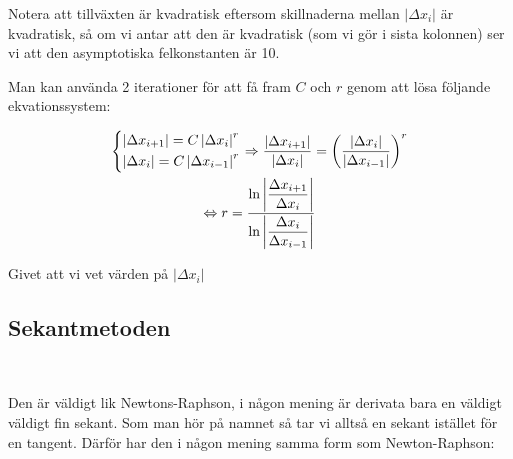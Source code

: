 \noindent Notera att tillväxten är kvadratisk eftersom skillnaderna mellan $\left|\Delta x_i\right|$ är kvadratisk, så om vi antar att den är kvadratisk (som vi gör i sista kolonnen) ser vi att den asymptotiska felkonstanten är 10.
\par\bigskip
\noindent Man kan använda 2 iterationer för att få fram $C$ och $r$ genom att lösa följande ekvationssystem:


\begin{equation*}
  \begin{gathered}
    \begin{cases*}
      \left|\Delta x_{i+1}\right| = C\left|\Delta x_i\right|^r\\
      \left|\Delta x_i\right| = C\left|\Delta x_{i-1}\right|^r
    \end{cases*} \Rightarrow \dfrac{\left|\Delta x_{i+1}\right|}{\left|\Delta x_i\right|} = \left(\dfrac{\left|\Delta x_i\right|}{\left|\Delta x_{i-1}\right|}\right)^r\\
    \Lrarr r = \dfrac{\ln\left|\dfrac{\Delta x_{i+1}}{\Delta x_i}\right|}{\ln\left|\dfrac{\Delta x_i}{\Delta x_{i-1}}\right|}
  \end{gathered}
\end{equation*}\par
\noindent Givet att vi vet värden på $\left|\Delta x_i\right|$

\subsection{Sekantmetoden}\hfill\\
\par\bigskip
\noindent Den är väldigt lik Newtons-Raphson, i någon mening är derivata bara en väldigt väldigt fin sekant. Som man hör på namnet så tar vi alltså en sekant istället för en tangent. Därför har den i någon mening samma form som Newton-Raphson:



